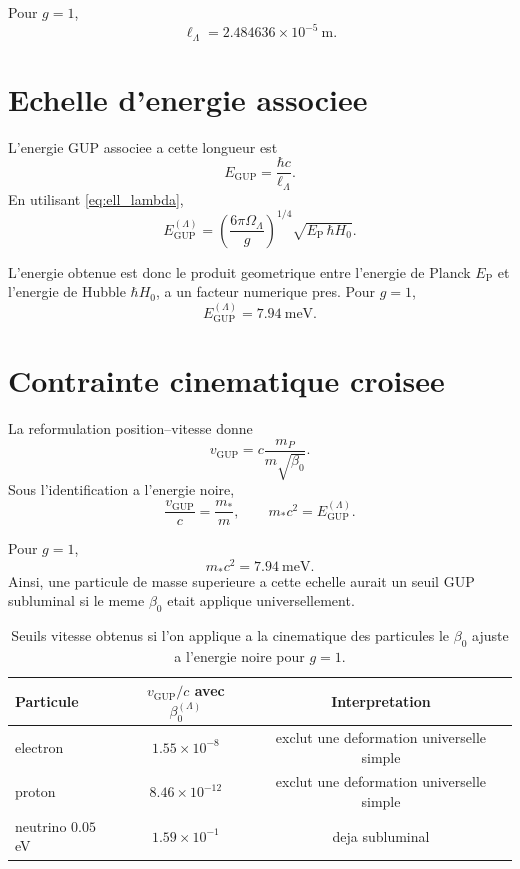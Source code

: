 \documentclass[11pt,a4paper]{article}
\newcommand{\hb}{\hbar}
\newcommand{\EP}{E_{\mathrm P}}
\newcommand{\OmL}{\Omega_{\Lambda}}
\newcommand{\lL}{\ell_{\Lambda}}
\begin{document}
Pour $g=1$,
\begin{equation}
\lL=2.484636\times10^{-5}\ \mathrm{m}.
\end{equation}

\section{Echelle d'energie associee}

L'energie GUP associee a cette longueur est
\begin{equation}
E_{\mathrm{GUP}}=\frac{\hb c}{\lL}.
\end{equation}
En utilisant \eqref{eq:ell_lambda},
\begin{equation}
\boxed{
E_{\mathrm{GUP}}^{(\Lambda)}
=
\left(\frac{6\pi\OmL}{g}\right)^{1/4}
\sqrt{\EP\,\hb H_0}.
}
\label{eq:energy_geomean}
\end{equation}

L'energie obtenue est donc le produit geometrique entre l'energie de Planck
$\EP$ et l'energie de Hubble $\hb H_0$, a un facteur numerique pres. Pour
$g=1$,
\begin{equation}
E_{\mathrm{GUP}}^{(\Lambda)}=7.94\ \mathrm{meV}.
\end{equation}

\section{Contrainte cinematique croisee}

La reformulation position--vitesse donne
\begin{equation}
v_{\mathrm{GUP}}
=
c\frac{m_P}{m\sqrt{\beta_0}}.
\end{equation}
Sous l'identification a l'energie noire,
\begin{equation}
\boxed{
\frac{v_{\mathrm{GUP}}}{c}
=
\frac{m_*}{m},
\qquad
m_*c^2=E_{\mathrm{GUP}}^{(\Lambda)}.
}
\label{eq:v_threshold_mass_star}
\end{equation}

Pour $g=1$,
\begin{equation}
m_*c^2=7.94\ \mathrm{meV}.
\end{equation}
Ainsi, une particule de masse superieure a cette echelle aurait un seuil GUP
subluminal si le meme $\beta_0$ etait applique universellement.

\begin{table}[h]
\centering
\begin{tabular}{lcc}
\toprule
Particule & $v_{\mathrm{GUP}}/c$ avec $\beta_0^{(\Lambda)}$ & Interpretation \\
\midrule
electron & $1.55\times10^{-8}$ & exclut une deformation universelle simple \\
proton & $8.46\times10^{-12}$ & exclut une deformation universelle simple \\
neutrino $0.05$ eV & $1.59\times10^{-1}$ & deja subluminal \\
\bottomrule
\end{tabular}
\caption{Seuils vitesse obtenus si l'on applique a la cinematique des particules le $\beta_0$ ajuste a l'energie noire pour $g=1$.}
\end{table}
\end{document}
